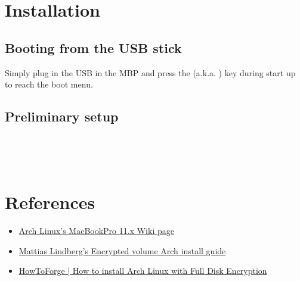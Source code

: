 \section{Installation}

\subsection{Booting from the USB stick}

Simply plug in the USB in the MBP and press the  (a.k.a. ) key during start up
to reach the boot menu.

\subsection{Preliminary setup}

\begin{itemize-steps}
	\item {}\\
	\item {}\\
\end{itemize-steps}


\clearpage
\section{References}

\begin{itemize}
	\item \href{https://wiki.archlinux.org/index.php/MacBookPro11,x#Using_the_MacBook.27s_native_EFI_bootloader_.28recommended.29}{Arch Linux's MacBookPro 11.x Wiki page}
	\item \href{https://gist.github.com/mattiaslundberg/8620837}{Mattias Lindberg's Encrypted volume Arch install guide}
	\item \href{https://www.howtoforge.com/tutorial/how-to-install-arch-linux-with-full-disk-encryption/}{HowToForge | How to install Arch Linux with Full Disk Encryption}
\end{itemize}

